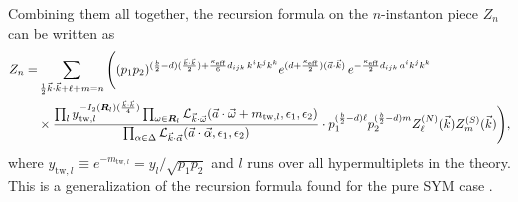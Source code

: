 \documentclass[letterpaper, 11pt]{article}
\newcommand{\nn}{\nonumber}
\def\CL{{\cal L}}
\def\a{\alpha}
\def\e{\epsilon}
\def\k{\kappa}
\def\w{\omega}
\def\D{\Delta}
\begin{document}
Combining them all together, the recursion formula on the $n$-instanton piece $Z_n$ can be written as
\begin{align}
  \label{eq:recursion}
  Z_n = &\sum_{\frac{1}{2}\vec{k}\cdot\vec{k} + \ell + m = n}  
  \Bigg( (p_1p_2)^{(\frac{b}{2} -d) (\frac{\vec{k}\cdot\vec{k}}{2}) +\frac{\k_\text{eff}}{6}d_{ijk}\,k^ik^jk^k} e^{(d+\frac{\k_\text{eff}}{2})(\vec{a}\cdot\vec{k})}\,
 e^{-\frac{\k_\text{eff}}{2}d_{ijk}\,a^ik^jk^k} \\& 
 \times    \frac{\prod_{l} y_{\text{tw}, l}^{-I_2(\boldsymbol{R}_l)(\frac{\vec{k}\cdot\vec{k}}{4})} \prod_{\w \in \boldsymbol{R}_l} \CL_{\vec{k}\cdot\vec{\w}}(\vec{a}\cdot \vec{\w} + m_{\text{tw},l}, \e_1,\e_2)}{ \prod_{\a \in \D} \CL_{\vec{k} \cdot \vec{\a}} (\vec{a}\cdot\vec{\alpha}, \epsilon_1, \epsilon_2)}
 \cdot p_1^{(\frac{b}{2}-d)\ell}p_2^{(\frac{b}{2}-d)m}Z^{(N)}_{\ell}(\vec{k})  Z^{(S)}_m (\vec{k}) \Bigg) \nn,
 \end{align}
where $y_{\text{tw},l} \equiv e^{-m_{\text{tw},l}} = y_l / \sqrt{p_1p_2}$ and $l$ runs over all hypermultiplets in the theory. This is a generalization of the recursion formula found for the pure SYM case \cite{Nakajima:2005fg,Gottsche:2006bm}. 
\end{document}
